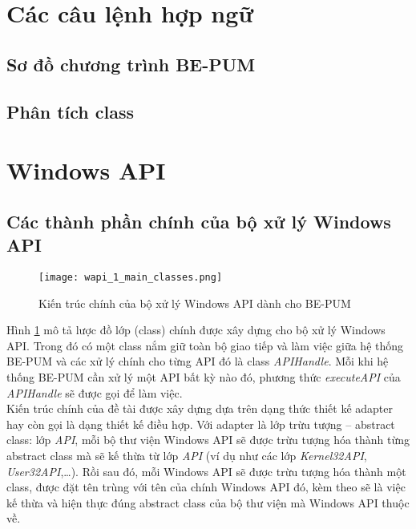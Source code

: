 \section{Các câu lệnh hợp ngữ}
	\subsection{Sơ đồ chương trình BE-PUM}
	\subsection{Phân tích class}

\newpage
\section{Windows API}

	\subsection{Các thành phần chính của bộ xử lý Windows API} \label{sec:main_classes}

	\begin{figure}[htp]
	\centering
		\texttt{[image: wapi\_1\_main\_classes.png]}
		\caption{Kiến trúc chính của bộ xử lý Windows API dành cho BE-PUM}	
		\label{fig:wapi_1_main_classes}		
	\end{figure}

Hình \ref{fig:wapi_1_main_classes} mô tả lược đồ lớp (class) chính được xây dựng cho bộ xử lý Windows API. Trong đó có một class nắm giữ toàn bộ giao tiếp và làm việc giữa hệ thống BE-PUM và các xử lý chính cho từng API đó là class \textit{APIHandle}. Mỗi khi hệ thống BE-PUM cần xử lý một API bất kỳ nào đó, phương thức \textit{executeAPI} của \textit{APIHandle} sẽ được gọi để làm việc.\\

Kiến trúc chính của đề tài được xây dựng dựa trên dạng thức thiết kế adapter hay còn gọi là dạng thiết kế điều hợp. Với adapter là lớp trừu tượng – abstract class: lớp \textit{API}, mỗi bộ thư viện Windows API sẽ được trừu tượng hóa thành từng abstract class mà sẽ kế thừa từ lớp \textit{API} (ví dụ như các lớp \textit{Kernel32API}, \textit{User32API},…). Rồi sau đó, mỗi Windows API sẽ được trừu tượng hóa thành một class, được đặt tên trùng với tên của chính Windows API đó, kèm theo sẽ là việc kế thừa và hiện thực đúng abstract class của bộ thư viện mà Windows API thuộc về.\\

